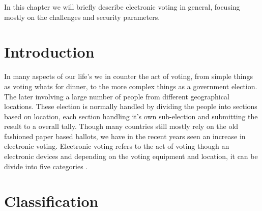 In this chapter we will briefly describe electronic voting in general, focusing mostly on the challenges and security parameters.

\section{Introduction}
In many aspects of our life's we in counter the act of voting, from simple things as voting whats for dinner, to the more complex things as a government election. The later involving a large number of people from different geographical locations. These election is normally handled by dividing the people into sections based on location, each section handling it's own sub-election and submitting the result to a overall tally. Though many countries still mostly rely on the old fashioned paper based ballots, we have in the recent years seen an increase in electronic voting. Electronic voting refers to the act of voting though an electronic devices and depending on the voting equipment and location, it can be divide into five categories \cite{Cet09}. 

\section{Classification}

